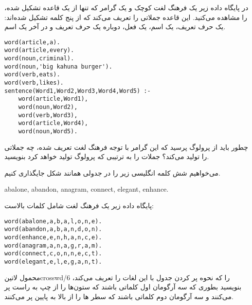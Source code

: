 \begin{exercise}
در پایگاه داده زیر یک فرهنگ لغت کوچک و یک گرامر که تنها از یک قاعده تشکیل شده، را مشاهده می‌کنید. این قاعده جملاتی را تعریف می‌کند که از پنج کلمه تشکیل شده‌اند: یک حرف تعریف، یک اسم، یک فعل، دوباره یک حرف تعریف و در آخر یک اسم.\\
\begin{latin}
\begin{lstlisting}
word(article,a).
word(article,every).
word(noun,criminal).
word(noun,'big kahuna burger').
word(verb,eats).
word(verb,likes).
sentence(Word1,Word2,Word3,Word4,Word5) :-
    word(article,Word1),
    word(noun,Word2),
    word(verb,Word3),
    word(article,Word4),
    word(noun,Word5).
\end{lstlisting}
\end{latin}
چطور باید از پرولوگ پرسید که این گرامر با توجه فرهنگ لغت تعریف شده، چه جملاتی را تولید می‌کند؟ جملات را به ترتیبی که پرولوگ تولید خواهد کرد بنویسید.
\end{exercise}
\begin{exercise}
می‌خواهیم شش کلمه انگلیسی زیر را در جدولی همانند شکل جایگذاری کنیم.\\
\begin{latin}
abalone, abandon, anagram, connect, elegant, enhance.\\

\end{latin}

پایگاه داده زیر یک فرهنگ لغت شامل کلمات بالاست:

\begin{latin}
\begin{lstlisting}
word(abalone,a,b,a,l,o,n,e).
word(abandon,a,b,a,n,d,o,n).
word(enhance,e,n,h,a,n,c,e).
word(anagram,a,n,a,g,r,a,m).
word(connect,c,o,n,n,e,c,t).
word(elegant,e,l,e,g,a,n,t).
\end{lstlisting}
\end{latin}

محمول ‌لاتین{crosswd/6} را که نحوه پر کردن جدول با این لغات را تعریف می‌کند، بنویسید بطوری که سه آرگومان اول کلماتی باشند که ستون‌ها را از چپ به راست پر می‌کنند و سه آرگومان دوم کلماتی باشند که سطر ها را از بالا به پایین پر می‌کنند.

\end{exercise}

